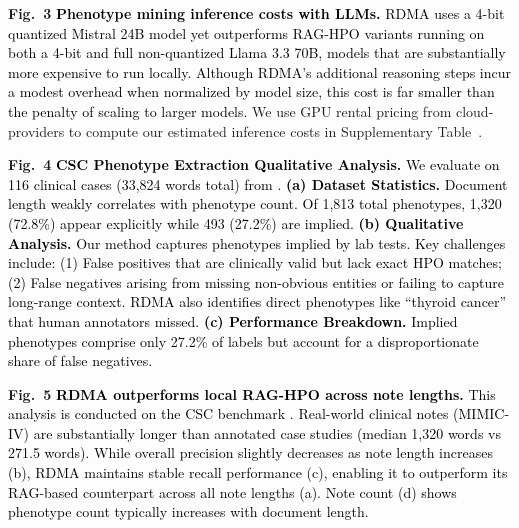 \documentclass[pdflatex,sn-mathphys-num]{sn-jnl}%
\newcommand{\rev}[1]{\textcolor{black}{#1}}
\theoremstyle{thmstyleone}%
\theoremstyle{thmstyletwo}%
\theoremstyle{thmstylethree}%
\begin{document}
\noindent\textbf{Fig.~3} \rev{\textbf{Phenotype mining inference costs with LLMs.} RDMA uses a 4-bit quantized Mistral 24B model yet outperforms RAG-HPO variants running on both a 4-bit and full non-quantized Llama 3.3 70B, models that are substantially more expensive to run locally. Although RDMA's additional reasoning steps incur a modest overhead when normalized by model size, this cost is far smaller than the penalty of scaling to larger models.} We use GPU rental pricing from cloud-providers \cite{salad_pricing} \cite{hyperstack_gpu_pricing} to compute our estimated inference costs in Supplementary Table~\sTabCostCalc.

\noindent\textbf{Fig.~4} \rev{\textbf{CSC Phenotype Extraction Qualitative Analysis.} We evaluate on 116 clinical cases (33,824 words total) from \cite{garcia2024_HPORAG}. \textbf{(a) Dataset Statistics.} Document length weakly correlates with phenotype count. Of 1,813 total phenotypes, 1,320 (72.8\%) appear explicitly while 493 (27.2\%) are implied. \textbf{(b) Qualitative Analysis.} Our method captures phenotypes implied by lab tests. Key challenges include: (1) False positives that are clinically valid but lack exact HPO matches; (2) False negatives arising from missing non-obvious entities or failing to capture long-range context. RDMA also identifies direct phenotypes like ``thyroid cancer'' that human annotators missed. \textbf{(c) Performance Breakdown.} Implied phenotypes comprise only 27.2\% of labels but account for a disproportionate share of false negatives.}

\noindent\textbf{Fig.~5} \rev{\textbf{RDMA outperforms local RAG-HPO across note lengths.} This analysis is conducted on the CSC benchmark \cite{garcia2024_HPORAG}. Real-world clinical notes (MIMIC-IV) are substantially longer than annotated case studies (median 1,320 words vs 271.5 words). While overall precision slightly decreases as note length increases (b), RDMA maintains stable recall performance (c), enabling it to outperform its RAG-based counterpart across all note lengths (a). Note count (d) shows phenotype count typically increases with document length.}
\end{document}
